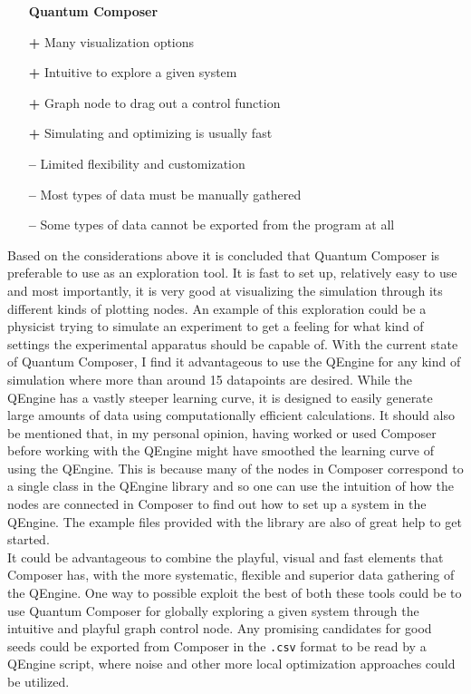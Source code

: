 \documentclass[a4paper, twocolumn]{revtex4-1}
\begin{document}
\begin{itemize}
	\item[] \textbf{Quantum Composer} 
	\item[\bf+] Many visualization options
	\item[\bf+] Intuitive to explore a given system
	\item[\bf+] Graph node to drag out a control function
	\item[\bf+] Simulating and optimizing is usually fast
	\item[\bf{--}] Limited flexibility and customization
	\item[\bf{--}] Most types of data must be manually gathered
	\item[\bf{--}] Some types of data cannot be exported from the program at all
\end{itemize}
Based on the considerations above it is concluded that Quantum Composer is preferable to use as an exploration tool. It is fast to set up, relatively easy to use and most importantly, it is very good at visualizing the simulation through its different kinds of plotting nodes. An example of this exploration could be a physicist trying to simulate an experiment to get a feeling for what kind of settings the experimental apparatus should be capable of. With the current state of Quantum Composer, I find it advantageous to use the QEngine for any kind of simulation where more than around 15 datapoints are desired. While the QEngine has a vastly steeper learning curve, it is designed to easily generate large amounts of data using computationally efficient calculations. It should also be mentioned that, in my personal opinion, having worked or used Composer before working with the QEngine might have smoothed the learning curve of using the QEngine. This is because many of the nodes in Composer correspond to a single class in the QEngine library and so one can use the intuition of how the nodes are connected in Composer to find out how to set up a system in the QEngine. The example files provided with the library are also of great help to get started.\\


It could be advantageous to combine the playful, visual and fast elements that Composer has, with the more systematic, flexible and superior data gathering of the QEngine. One way to possible exploit the best of both these tools could be to use Quantum Composer for globally exploring a given system through the intuitive and playful graph control node. Any promising candidates for good seeds could be exported from Composer in the \texttt{.csv} format to be read by a QEngine script, where noise and other more local optimization approaches could be utilized.
\end{document}
